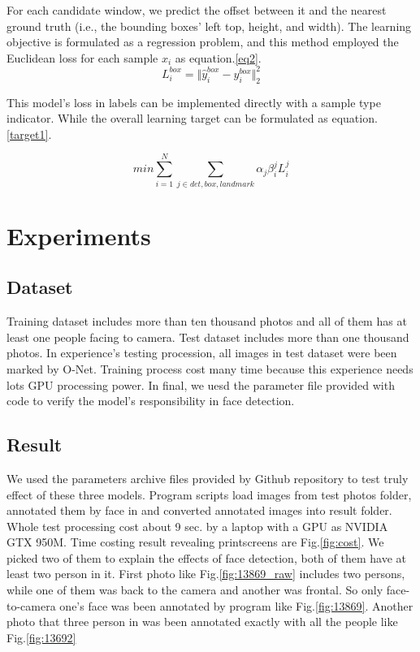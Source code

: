 \documentclass[journal, a4paper]{IEEEtran}
\begin{document}
For each candidate window, we  predict the offset between it and the nearest ground truth (i.e., the bounding boxes’ left top, height, and width). The learning objective is formulated as a regression problem, and this method employed the Euclidean loss for each sample $x_{i}$ as equation.\ref{eq2}.
\begin{equation}
    L_{i}^{box}=\Vert \hat{y}_{i}^{box}-y_{i}^{box} \Vert_2^{2} \label{eq2}
\end{equation}

This model's loss in labels can be implemented directly with a sample type indicator. While the overall learning target can be formulated as equation.\ref{target1}.

\begin{equation}
    min\sum_{i=1}^{N}\sum_{j \in  det,box,landmark  }\alpha_{j} \beta_{i}^{j} L_{i}^{j}\label{target1}
\end{equation}


\section{Experiments}
\subsection{Dataset}
Training dataset includes more than ten thousand photos and all of them has at least one people facing to camera. Test dataset includes more than one thousand photos. In experience's testing procession, all images in test dataset were been marked by O-Net. Training process cost many time because this experience needs lots GPU processing power. In final, we uesd the parameter file provided with code to verify the model's responsibility in face detection.

\subsection{Result}
We used the parameters archive files provided by Github repository to test truly effect of these three models. Program scripts load images from test photos folder, annotated them by face in and converted annotated images into result folder. Whole test processing cost about 9 sec. by a laptop with a GPU as NVIDIA GTX 950M. Time costing result revealing printscreens are Fig.\ref{fig:cost}.  We picked two of them to explain the effects of face detection, both of them have at least two person in it. First photo like Fig.\ref{fig:13869_raw} includes two persons, while one of them was back to the camera and another was frontal. So only face-to-camera one's face was been annotated by program like Fig.\ref{fig:13869}. Another photo that three person in was been annotated exactly with all the people like Fig.\ref{fig:13692}
\end{document}
